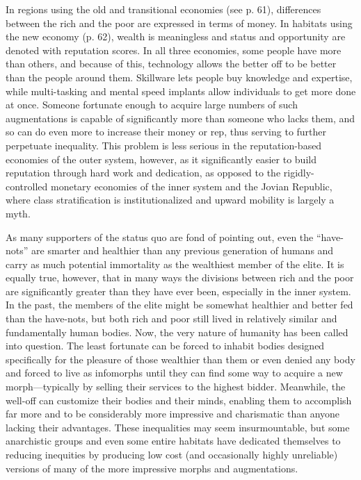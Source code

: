 In regions using the old and transitional economies (see p. 61), differences 
between the rich and the poor are expressed in terms of money. In habitats 
using the new economy (p. 62), wealth is 
meaningless and status and opportunity 
are denoted with reputation scores. In all 
three economies, some people have more 
than others, and because of this, technology allows the better off to be better 
than the people around them. Skillware 
lets people buy knowledge and expertise, while multi-tasking and mental 
speed implants allow individuals to get 
more done at once. Someone fortunate 
enough to acquire large numbers of such 
augmentations is capable of significantly 
more than someone who lacks them, and 
so can do even more to increase their 
money or rep, thus serving to further 
perpetuate inequality. This problem is 
less serious in the reputation-based economies of the outer system, however, as 
it significantly easier to build reputation 
through hard work and dedication, as 
opposed to the rigidly-controlled monetary economies of the inner system and 
the Jovian Republic, where class stratification is institutionalized and upward 
mobility is largely a myth.

As many supporters of the status quo 
are fond of pointing out, even the ``have-nots'' are smarter and healthier than 
any previous generation of humans and 
carry as much potential immortality as 
the wealthiest member of the elite. It is 
equally true, however, that in many ways 
the divisions between rich and the poor 
are significantly greater than they have 
ever been, especially in the inner system. 
In the past, the members of the elite 
might be somewhat healthier and better 
fed than the have-nots, but both rich and 
poor still lived in relatively similar and 
fundamentally human bodies. Now, the 
very nature of humanity has been called 
into question. The least fortunate can be 
forced to inhabit bodies designed specifically for the pleasure of those wealthier 
than them or even denied any body and 
forced to live as infomorphs until they 
can find some way to acquire a new 
morph—typically by selling their services 
to the highest bidder. Meanwhile, the 
well-off can customize their bodies and 
their minds, enabling them to accomplish 
far more and to be considerably more 
impressive and charismatic than anyone 
lacking their advantages. These inequalities may seem insurmountable, but some 
anarchistic groups and even some entire 
habitats have dedicated themselves to 
reducing inequities by producing low 
cost (and occasionally highly unreliable) 
versions of many of the more impressive 
morphs and augmentations.

